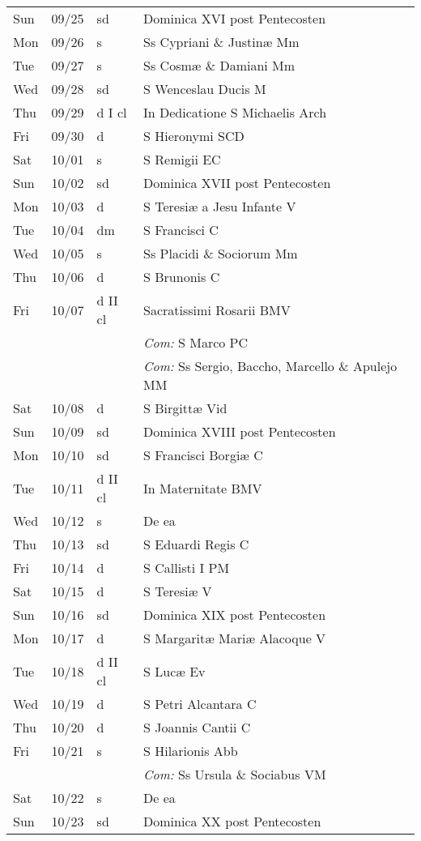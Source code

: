 \documentclass[10pt]{article}
\begin{document}
\begin{longtable}{ l l l l }
Sun & 09/25 & sd & Dominica XVI post Pentecosten\\
Mon & 09/26 & s & Ss Cypriani \& Justinæ Mm\\
Tue & 09/27 & s & Ss Cosmæ \& Damiani Mm\\
Wed & 09/28 & sd & S Wenceslau Ducis M\\
Thu & 09/29 & d I cl & In Dedicatione S Michaelis Arch\\
Fri & 09/30 & d & S Hieronymi SCD\\
Sat & 10/01 & s & S Remigii EC\\
Sun & 10/02 & sd & Dominica XVII post Pentecosten\\
Mon & 10/03 & d & S Teresiæ a Jesu Infante V\\
Tue & 10/04 & dm & S Francisci C\\
Wed & 10/05 & s & Ss Placidi \& Sociorum Mm\\
Thu & 10/06 & d & S Brunonis C\\
Fri & 10/07 & d II cl & Sacratissimi Rosarii BMV\\
 & & & \textit{Com:} S Marco PC\\
 & & & \textit{Com:} Ss Sergio, Baccho, Marcello \& Apulejo MM\\
Sat & 10/08 & d & S Birgittæ Vid\\
Sun & 10/09 & sd & Dominica XVIII post Pentecosten\\
Mon & 10/10 & sd & S Francisci Borgiæ C\\
Tue & 10/11 & d II cl & In Maternitate BMV\\
Wed & 10/12 & s & De ea\\
Thu & 10/13 & sd & S Eduardi Regis C\\
Fri & 10/14 & d & S Callisti I PM\\
Sat & 10/15 & d & S Teresiæ V\\
Sun & 10/16 & sd & Dominica XIX post Pentecosten\\
Mon & 10/17 & d & S Margaritæ Mariæ Alacoque V\\
Tue & 10/18 & d II cl & S Lucæ Ev\\
Wed & 10/19 & d & S Petri Alcantara C\\
Thu & 10/20 & d & S Joannis Cantii C\\
Fri & 10/21 & s & S Hilarionis Abb\\
 & & & \textit{Com:} Ss Ursula \& Sociabus VM\\
Sat & 10/22 & s & De ea\\
Sun & 10/23 & sd & Dominica XX post Pentecosten\\

\end{longtable}
\end{document}
